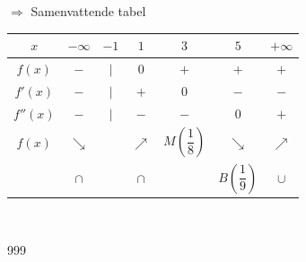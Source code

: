 \documentclass[a4paper]{article}
\begin{document}
$\Rightarrow$ Samenvattende tabel\\

\begin{tabular}{c|cccccc}

$x$ & $-\infty$ & $-1$ & $1$ & $3$ & $5$ & $+\infty$ \\ \hline

$f(x)$ & $-$ & $|$ & $0$ & $+$ & $+$ & $+$ \\

$f'(x)$ & $-$ & $|$ & $+$ & $0$ & $-$ & $-$ \\

$f''(x)$ & $-$ & $|$ & $-$ & $-$ & $0$ & $+$ \\ \hline

$f(x)$ & $\searrow$ &  & $\nearrow$ & $M\left(\dfrac{1}{8}\right)$ & $\searrow$ & $\nearrow$ \\

& $\cap$ &  & $\cap$ &  & $B\left(\dfrac{1}{9}\right)$ & $\cup$ \\

\end{tabular}\\

\begin{thebibliography}{999}
\end{thebibliography}
\end{document}
